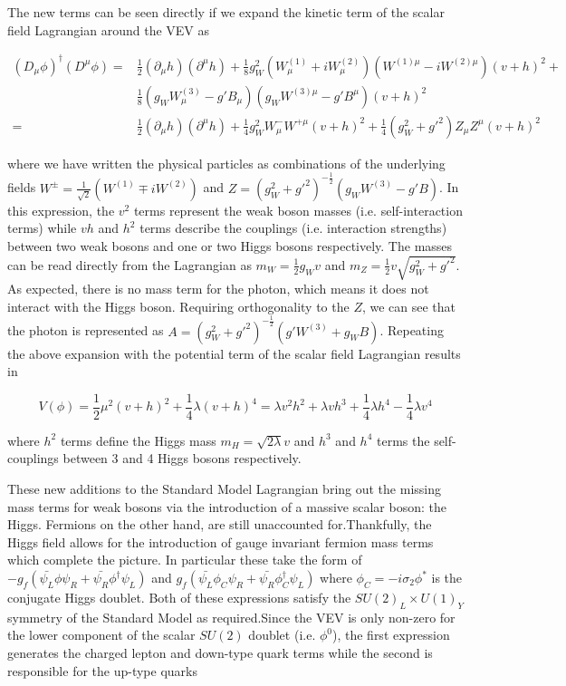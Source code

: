 The new terms can be seen directly if we expand the kinetic term of the scalar field Lagrangian around the VEV as

\begin{equation}
\begin{aligned}
(D_{\mu}\phi)^{\dagger}(D^{\mu}\phi) =& \frac{1}{2}(\partial_{\mu}h)(\partial^{\mu}h) + 
\frac{1}{8}g_W^2(W_{\mu}^{(1)} + iW_{\mu}^{(2)})(W^{(1)\mu} - iW^{(2)\mu})(v+h)^2 + \\
&\frac{1}{8}(g_WW_{\mu}^{(3)} - g'B_{\mu})(g_WW^{(3)\mu} - g'B^{\mu})(v+h)^2 \\
=&\frac{1}{2}(\partial_{\mu}h)(\partial^{\mu}h) + \frac{1}{4}g_W^2W_{\mu}^-W^{+\mu}(v+h)^2 + 
\frac{1}{4}(g_W^2+g'^2)Z_{\mu}Z^{\mu}(v+h)^2
\end{aligned}
\end{equation}

where we have written the physical particles as combinations of the underlying fields 
$W^{\pm} = \frac{1}{\sqrt{2}}(W^{(1)} \mp iW^{(2)})$ and 
$Z = (g^2_W + g'^2)^{-\frac{1}{2}}(g_WW^{(3)} - g'B)$. In this expression,  the $v^2$ terms represent 
the weak boson masses (i.e. self-interaction terms) while $vh$ and $h^2$ terms describe the couplings 
(i.e. interaction strengths) between two weak bosons and one or two Higgs bosons respectively. The masses 
can be read directly from the Lagrangian as $m_W = \frac{1}{2}g_Wv$ and 
$m_Z = \frac{1}{2}v\sqrt{g^2_W + g'^2}$. As expected, there is no mass term for the photon, which means 
it does not interact with the Higgs boson. Requiring orthogonality to the $Z$, we can see that the photon is 
represented as $A = (g^2_W + g'^2)^{-\frac{1}{2}}(g'W^{(3)} + g_WB)$. Repeating the above expansion 
with the potential term of the scalar field Lagrangian results in 

\begin{equation}
V(\phi) = \frac{1}{2}\mu^2(v+h)^2 + \frac{1}{4}\lambda(v+h)^4 = 
\lambda v^2h^2 + \lambda vh^3 + \frac{1}{4}\lambda h^4 - \frac{1}{4}\lambda v^4
\end{equation}

where $h^2$ terms define the Higgs mass $m_H = \sqrt{2\lambda}v$ and $h^3$ and $h^4$ terms the 
self-couplings between 3 and 4 Higgs bosons respectively. \par

These new additions to the Standard Model Lagrangian bring out the missing mass terms for weak bosons 
via the introduction of a massive scalar boson: the Higgs. Fermions on the other hand, are still unaccounted 
for.Thankfully, the Higgs field allows for the introduction of gauge invariant fermion mass terms which 
complete the picture. In particular these take the form of 
$-g_f(\bar{\psi_L}\phi\psi_R + \bar{\psi_R}\phi^{\dagger}\psi_L)$ and 
$g_f(\bar{\psi_L}\phi_C\psi_R + \bar{\psi_R}\phi_C^{\dagger}\psi_L)$ where $\phi_C = -i\sigma_2\phi^*$ 
is the conjugate Higgs doublet. Both of these expressions satisfy the $SU(2)_L \times U(1)_Y$ symmetry of 
the Standard Model as required.Since the VEV is only non-zero for the lower component of the scalar 
$SU(2)$ doublet (i.e. $\phi^0$), the first expression generates the charged lepton and down-type quark 
terms while the second is responsible for the up-type quarks

